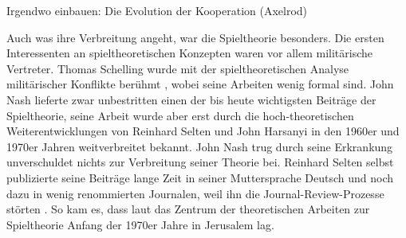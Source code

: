 Irgendwo einbauen: Die Evolution der Kooperation (Axelrod)


Auch was ihre Verbreitung angeht, war die Spieltheorie besonders. Die ersten Interessenten an spieltheoretischen Konzepten waren vor allem militärische Vertreter. Thomas Schelling wurde mit der spieltheoretischen Analyse militärischer Konflikte berühmt \parencite{Schelling1960}, wobei seine Arbeiten wenig formal sind. John Nash lieferte zwar unbestritten einen der bis heute wichtigsten Beiträge der Spieltheorie, seine Arbeit wurde aber erst durch die hoch-theoretischen Weiterentwicklungen von Reinhard Selten und John Harsanyi in den 1960er und 1970er Jahren weitverbreitet bekannt. John Nash trug durch seine Erkrankung unverschuldet nichts zur Verbreitung seiner Theorie bei. Reinhard Selten selbst publizierte seine Beiträge lange Zeit in seiner Muttersprache Deutsch und noch dazu in wenig renommierten Journalen, weil ihn die Journal-Review-Prozesse störten \parencite[S. 215]{Frey2003}. So kam es, dass laut \textcite[S. 120]{Roth2019} das Zentrum der theoretischen Arbeiten zur Spieltheorie Anfang der 1970er Jahre in Jerusalem lag. 

